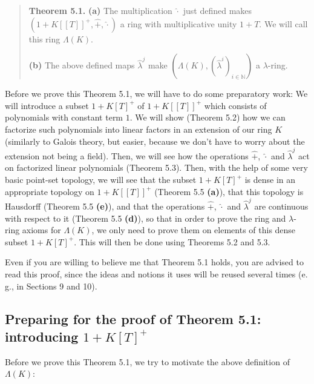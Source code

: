 \documentclass[numbers=enddot,12pt,final,onecolumn,notitlepage]{scrartcl}%
\begin{document}
\begin{quote}
\textbf{Theorem 5.1.} \textbf{(a)} The multiplication $\widehat{\cdot}$ just
defined makes $\left(  1+K\left[  \left[  T\right]  \right]  ^{+}%
,\widehat{+},\widehat{\cdot}\right)  $ a ring with multiplicative unity $1+T$.
We will call this ring $\Lambda\left(  K\right)  $.

\textbf{(b)} The above defined maps $\widehat{\lambda}^{j}$ make $\left(
\Lambda\left(  K\right)  ,\left(  \widehat{\lambda}^{i}\right)  _{i\in
\mathbb{N}}\right)  $ a $\lambda$-ring.
\end{quote}

Before we prove this Theorem 5.1, we will have to do some preparatory work: We
will introduce a subset $1+K\left[  T\right]  ^{+}$ of $1+K\left[  \left[
T\right]  \right]  ^{+}$ which consists of polynomials with constant term $1$.
We will show (Theorem 5.2) how we can factorize such polynomials into linear
factors in an extension of our ring $K$ (similarly to Galois theory, but
easier, because we don't have to worry about the extension not being a field).
Then, we will see how the operations $\widehat{+}$, $\widehat{\cdot}$ and
$\widehat{\lambda}^{j}$ act on factorized linear polynomials (Theorem 5.3).
Then, with the help of some very basic point-set topology, we will see that
the subset $1+K\left[  T\right]  ^{+}$ is dense in an appropriate topology on
$1+K\left[  \left[  T\right]  \right]  ^{+}$ (Theorem 5.5 \textbf{(a)}), that
this topology is Hausdorff (Theorem 5.5 \textbf{(e)}), and that the operations
$\widehat{+}$, $\widehat{\cdot}$ and $\widehat{\lambda}^{j}$ are continuous
with respect to it (Theorem 5.5 \textbf{(d)}), so that in order to prove the
ring and $\lambda$-ring axioms for $\Lambda\left(  K\right)  $, we only need
to prove them on elements of this dense subset $1+K\left[  T\right]  ^{+}$.
This will then be done using Theorems 5.2 and 5.3.

Even if you are willing to believe me that Theorem 5.1 holds, you are advised
to read this proof, since the ideas and notions it uses will be reused several
times (e. g., in Sections 9 and 10).

\subsection{Preparing for the proof of Theorem 5.1: introducing $1+K\left[
T\right]  ^{+}$}

Before we prove this Theorem 5.1, we try to motivate the above definition of
$\Lambda\left(  K\right)  $:
\end{document}
